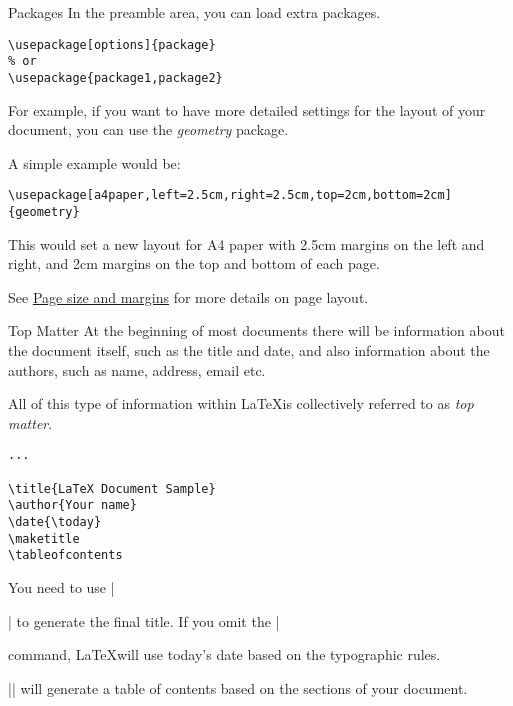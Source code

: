\begin{frame}[fragile]{Packages}
    In the preamble area, you can load extra packages.

    \begin{command}
        \begin{verbatim}
\usepackage[options]{package}
% or
\usepackage{package1,package2}
        \end{verbatim}
    \end{command}

    For example, if you want to have more detailed settings for the layout of your document, you can use the \textit{geometry} package.

    \pause
    
    A simple example would be:

    \begin{command}
        \begin{verbatim}
\usepackage[a4paper,left=2.5cm,right=2.5cm,top=2cm,bottom=2cm]{geometry}
        \end{verbatim}
    \end{command}

    This would set a new layout for A4 paper with 2.5cm margins on the left and right, and 2cm margins on the top and bottom of each page.


    See \href{https://www.overleaf.com/learn/latex/Page_size_and_margins}{Page size and margins} for more details on page layout.
\end{frame}

\begin{frame}[fragile]{Top Matter}
    At the beginning of most documents there will be information about the document itself, such as the title and date, and also information about the authors, such as name, address, email etc.

    All of this type of information within \LaTeX is collectively referred to as \textit{top matter}.

    \pause

    \begin{command}
        \begin{verbatim}
...

\title{LaTeX Document Sample}
\author{Your name}
\date{\today}
\maketitle
\tableofcontents

        \end{verbatim}
    \end{command}

    \pause
    You need to use \LC|\maketitle| to generate the final title. If you omit the \LC|\date| command, \LaTeX will use today's date based on the typographic rules.

    \pause
    \LC|\tableofcontents| will generate a table of contents based on the sections of your document.
\end{frame}

